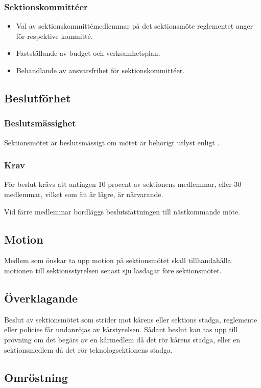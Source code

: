 \subsubsection{Sektionskommittéer}
\begin{itemize}
	\item Val av sektionskommittémedlemmar på det sektionsmöte reglementet anger för respektive kommitté. 
	\item Fastställande av budget och verksamhetsplan.
	\item Behandlande av ansvarsfrihet för sektionskommittéer.
\end{itemize}

\subsection{Beslutförhet}

\subsubsection{Beslutsmässighet}
Sektionsmötet är beslutsmässigt om mötet är behörigt utlyst enligt .

\subsubsection{Krav}
För beslut krävs att antingen 10 procent av sektionens medlemmar, eller 30 medlemmar, vilket som än är lägre, är närvarande.

Vid färre medlemmar bordläggs beslutsfattningen till nästkommande möte.

\subsection{Motion}
Medlem som önskar ta upp motion på sektionsmötet skall tillhandahålla motionen till sektionsstyrelsen senast sju läsdagar före sektionsmötet.

\subsection{Överklagande}
Beslut av sektionsmötet som strider mot kårens eller sektions stadga, reglemente eller policies får undanröjas av kårstyrelsen. Sådant beslut kan tas upp till prövning om det begärs av en kårmedlem då det rör kårens stadga, eller en sektionsmedlem då det rör teknologsektionens stadga.

\subsection{Omröstning}

